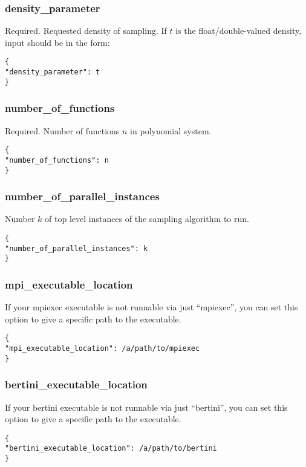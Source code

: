\documentclass[11pt]{article}
\begin{document}
\subsubsection{density\_parameter}
Required. Requested density of sampling. If $t$ is the float/double-valued density, input should be in the form: 

\begin{verbatim}
{
"density_parameter": t
}
\end{verbatim} 

\subsubsection{number\_of\_functions}
Required. Number of functions $n$ in polynomial system. 

\begin{verbatim} 
{
"number_of_functions": n
}
\end{verbatim}

\subsubsection{number\_of\_parallel\_instances}
Number $k$ of top level instances of the sampling algorithm to run. 

\begin{verbatim}
{ 
"number_of_parallel_instances": k
}
\end{verbatim} 

\subsubsection{mpi\_executable\_location}

If your mpiexec executable is not runnable via just ``mpiexec'', you can set this option to give a specific path to the executable. 

\begin{verbatim}
{ 
"mpi_executable_location": /a/path/to/mpiexec
}
\end{verbatim} 

\subsubsection{bertini\_executable\_location} 

If your bertini executable is not runnable via just ``bertini'', you can set this option to give a specific path to the executable. 

\begin{verbatim}
{ 
"bertini_executable_location": /a/path/to/bertini
}
\end{verbatim} 
\end{document}
